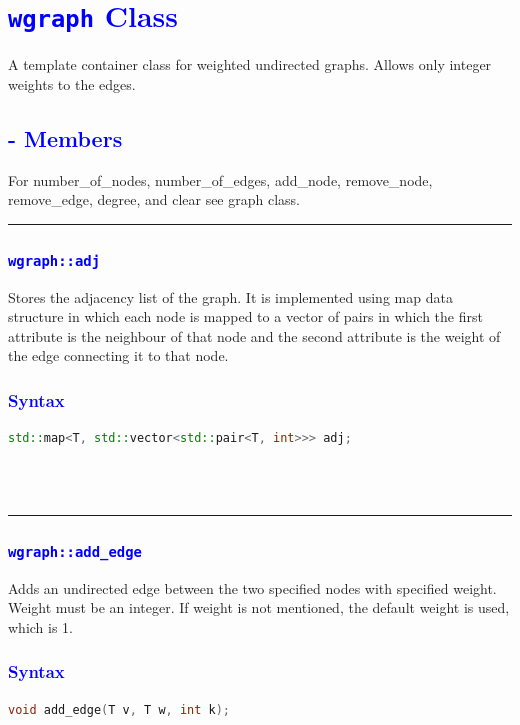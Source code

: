 \documentclass[11pt,a4paper]{article}
\begin{document}
\section*{\textcolor{blue}{{\huge \texttt{wgraph} Class}} }
A template container class for weighted undirected graphs. Allows only integer weights to the edges.

\subsection*{\textcolor{blue}{{\LARGE - Members}}}
For number\_of\_nodes, number\_of\_edges, add\_node, remove\_node, remove\_edge, degree, and clear see graph class.


\rule{17cm}{0.1mm}

\subsubsection*{\textcolor{blue}{\Large\texttt{wgraph::adj}}}
Stores the adjacency list of the graph. It is implemented using map data structure in which each node is mapped to a vector of pairs in which the first attribute is the neighbour of that node and the second attribute is the weight of the edge connecting it to that node.






\subsubsection*{\textcolor{blue}{ \large {Syntax}}}
\begin{lstlisting}[language=C++]
std::map<T, std::vector<std::pair<T, int>>> adj;



\end{lstlisting}



\
\\
\rule{17cm}{0.1mm}


\subsubsection*{\textcolor{blue}{\Large\texttt{wgraph::add\_edge}}}
Adds an undirected edge between the two specified nodes with specified weight. Weight must be an integer. If weight is not mentioned, the default weight is used, which is 1.

\subsubsection*{\textcolor{blue}{ \large {Syntax}}}
\begin{lstlisting}[language=C++]
void add_edge(T v, T w, int k);
\end{lstlisting}
\end{document}

